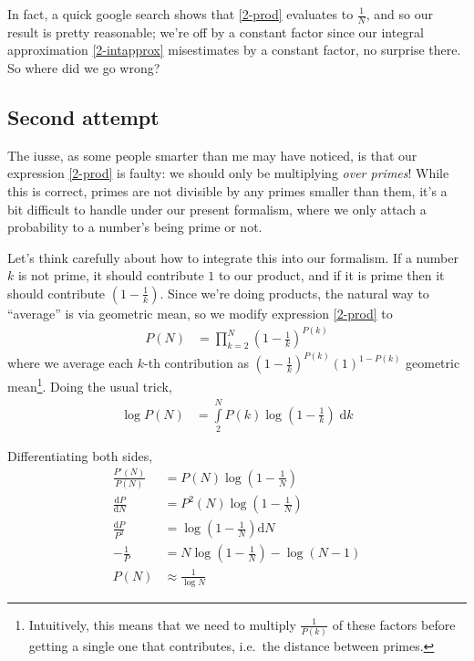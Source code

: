 \documentclass[12pt]{report}
\newcommand{\rd}[2]{\frac{\mathrm{d}#1}{\mathrm{d}#2}}
\begin{document}
In fact, a quick google search shows that \autoref{2-prod} evaluates to
$\frac{1}{N}$, and so our result is pretty reasonable; we're off by a constant
factor since our integral approximation \autoref{2-intapprox} misestimates by a
constant factor, no surprise there. So where did we go wrong?

\subsection{Second attempt}

The iusse, as some people smarter than me may have noticed, is that our
expression \autoref{2-prod} is faulty: we should only be multiplying \emph{over
primes}! While this is correct, primes are not divisible by any primes smaller
than them, it's a bit difficult to handle under our present formalism, where we
only attach a probability to a number's being prime or not.

Let's think carefully about how to integrate this into our formalism. If a
number $k$ is not prime, it should contribute $1$ to our product, and if it is
prime then it should contribute $\left( 1 - \frac{1}{k} \right)$. Since we're
doing products, the natural way to ``average'' is via geometric mean, so we
modify expression \autoref{2-prod} to
\begin{align}
    P(N) &= \prod\limits_{k=2}^{N}\left( 1 - \frac{1}{k}
    \right)^{P(k)}\label{2-improved}
\end{align}
where we average each $k$-th contribution as $\left( 1 - \frac{1}{k}
\right)^{P(k)}(1)^{1-P(k)}$ geometric mean\footnote{Intuitively, this means that
we need to multiply $\frac{1}{P(k)}$ of these factors before getting a single
one that contributes, i.e.\ the distance between primes.}. Doing the usual trick,
\begin{align}
    \log P(N) &= \int\limits_{2}^{N}P(k) \log\left( 1 - \frac{1}{k}
    \right)\;\mathrm{d}k
\end{align}

Differentiating both sides,
\begin{align}
    \frac{P'(N)}{P(N)} &= P(N)\log\left( 1 - \frac{1}{N} \right)\\
    \rd{P}{N} &= P^2(N)\log\left( 1 - \frac{1}{N} \right)\\
    \frac{\mathrm{d}P}{P^2} &= \log\left( 1 - \frac{1}{N} \right)\mathrm{d}N\\
    -\frac{1}{P} &= N\log\left( 1 - \frac{1}{N} \right) - \log\left( N - 1
    \right)\\
    P(N) &\approx \frac{1}{\log N}
\end{align}
\end{document}
